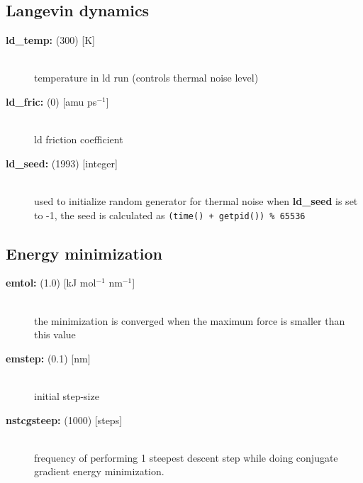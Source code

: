 \subsection{ Langevin dynamics}
\begin{description}
\item[{\bf ld\_temp: }(300) {[K]}]\mbox{}\\
temperature in ld run (controls thermal noise level)
\item[{\bf ld\_fric: }(0) {[amu ps$^{-1}$]}]\mbox{}\\
ld friction coefficient
\item[{\bf ld\_seed: }(1993) {[integer]}]\mbox{}\\
used to initialize random generator for thermal noise
when {\bf ld\_seed} is set to -1, the seed is calculated as
{\tt (time() + getpid()) \% 65536}
\end{description}

\subsection{ Energy minimization}
\begin{description}
\item[{\bf emtol: }(1.0) {[kJ mol$^{-1}$ nm$^{-1}$]}]\mbox{}\\
the minimization is converged when the maximum force is smaller than 
this value
\item[{\bf emstep: }(0.1) {[nm]}]\mbox{}\\
initial step-size
\item[{\bf nstcgsteep: }(1000) {[steps]}]\mbox{}\\
frequency of performing 1 steepest descent step while doing
conjugate gradient energy minimization.
\end{description}

